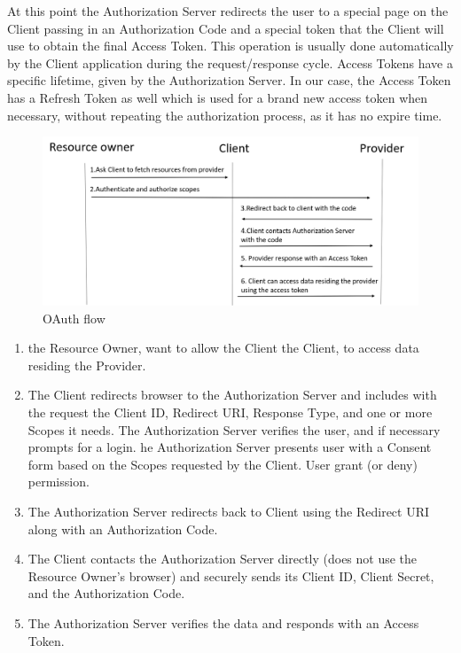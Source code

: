 At this point the Authorization Server redirects the user to a special page on the Client passing in an Authorization Code and a special token that the Client will use to obtain the final Access Token. This operation is usually done automatically by the Client application during the request/response cycle. Access Tokens have a specific lifetime, given by the Authorization Server. In our case, the Access Token has a Refresh Token as well which is used for a brand new access token when necessary, without repeating the authorization process, as it has no expire time.

\begin{figure}[htb]
	\centering
	\includegraphics[scale=0.3]{figures/oauth.png}
	\caption{OAuth flow}
\end{figure}



	\begin{enumerate}
		\item the Resource Owner, want to allow the Client the Client, to access data residing the Provider.
		
		\item The Client redirects browser to the Authorization Server and includes with the request the Client ID, Redirect URI, Response Type, and one or more Scopes it needs. The Authorization Server verifies the user, and if necessary prompts for a login. he Authorization Server presents user with a Consent form based on the Scopes requested by the Client. User grant (or deny) permission.
		
		\item The Authorization Server redirects back to Client using the Redirect URI along with an Authorization Code.
		
		\item The Client contacts the Authorization Server directly (does not use the Resource Owner’s browser) and securely sends its Client ID, Client Secret, and the Authorization Code.
		
		\item The Authorization Server verifies the data and responds with an Access Token.
		
	\end{enumerate}


